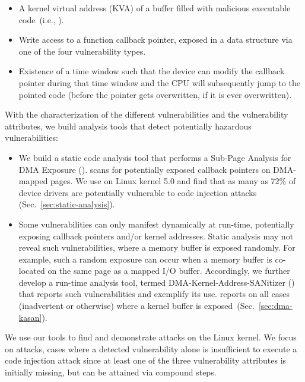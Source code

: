 \begin{itemize}
    \item A kernel virtual address (KVA) of a buffer filled with malicious executable code~(i.e., \mabaf).
    \item Write access to a function callback pointer, exposed in a data structure via one of the four \subpage vulnerability types. 
    \item Existence of a time window such that the device can modify the callback pointer during that time window and the CPU will subsequently jump to the pointed code (before the pointer gets overwritten, if it is ever overwritten). 
\end{itemize} 

With the characterization of the different \subpage{} vulnerabilities and the vulnerability attributes, we build analysis tools that detect potentially hazardous \subpage{} vulnerabilities:

\begin{itemize}
    \item We build a static code analysis tool that performs a Sub-Page Analysis for DMA Exposure (\tool). \tool scans for potentially exposed callback pointers on DMA-mapped pages. We use \tool on Linux kernel 5.0 and find that as many as 72\% of device drivers are potentially vulnerable to code injection attacks (Sec.~\ref{sec:static-analysis}). 

    \item Some \subpage{} vulnerabilities can only manifest dynamically at run-time, potentially exposing callback pointers and/or kernel addresses. Static analysis may not reveal such vulnerabilities, where a memory buffer is exposed randomly. For example, such a random exposure can occur when a memory buffer is co-located on the same page as a mapped I/O buffer. Accordingly, we further develop a run-time analysis tool, termed DMA-Kernel-Address-SANitizer (\dkasan) that reports such vulnerabilities and exemplify its use. \dkasan reports on all cases (inadvertent or otherwise) where a kernel buffer is exposed~(Sec.~\ref{sec:dma-kasan}).
\end{itemize}

We use our tools to find and demonstrate attacks on the Linux kernel. We focus on \compound attacks, cases where a detected \subpage vulnerability alone is insufficient to execute a code injection attack since at least one of the three vulnerability attributes is initially missing, but can be attained via compound steps. 

